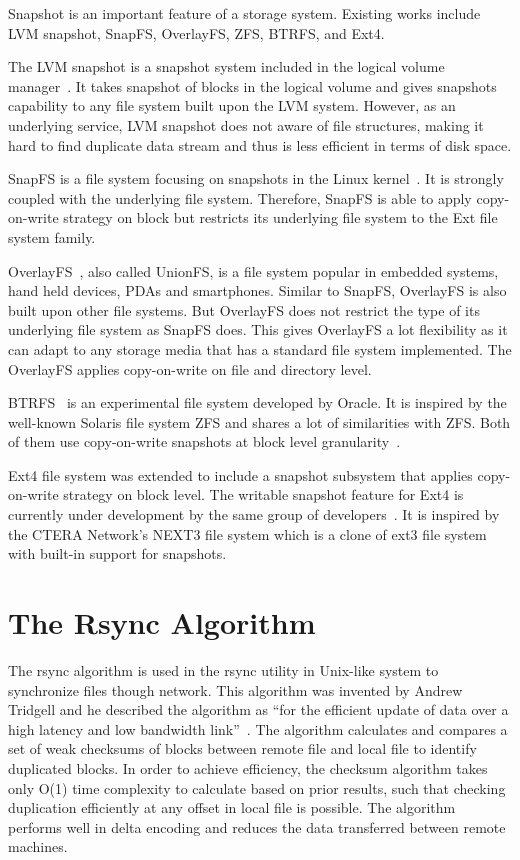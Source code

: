    Snapshot is an important feature of a storage system. Existing works include LVM snapshot, SnapFS, OverlayFS, ZFS, BTRFS, and Ext4.
    
    The LVM snapshot is a snapshot system included in the logical volume manager~\cite{lvm, disk_perform_lvm}. It takes snapshot of blocks in the logical volume and gives snapshots capability to any file system built upon the LVM system. However, as an underlying service, LVM snapshot does not aware of file structures, making it hard to find duplicate data stream and thus is less efficient in terms of disk space.
    
    SnapFS is a file system focusing on snapshots in the Linux kernel~\cite{snapfs}. It is strongly coupled with the underlying file system. Therefore, SnapFS is able to apply copy-on-write strategy on block but restricts its underlying file system to the Ext file system family. 
    
    OverlayFS~\cite{overlayfs}, also called UnionFS, is a file system popular in embedded systems, hand held devices, PDAs and smartphones. Similar to SnapFS, OverlayFS is also built upon other file systems. But OverlayFS does not restrict the type of its underlying file system as SnapFS does. This gives OverlayFS a lot flexibility as it can adapt to any storage media that has a standard file system implemented. The OverlayFS applies copy-on-write on file and directory level.

    BTRFS~\cite{btrfs} is an experimental file system developed by Oracle. It is inspired by the well-known Solaris file system ZFS and shares a lot of similarities with ZFS. Both of them use copy-on-write snapshots at block level granularity~\cite{btrfscow}.
    
    Ext4 file system was extended to include a snapshot subsystem that applies copy-on-write strategy on block level. The writable snapshot feature for Ext4 is currently under development by the same group of developers~\cite{ext4snap}. It is inspired by the CTERA Network's NEXT3 file system which is a clone of ext3 file system with built-in support for snapshots.

\section{The Rsync Algorithm}
    
    The rsync algorithm is used in the rsync utility in Unix-like system to synchronize files though network. This algorithm was invented by Andrew Tridgell and he described the algorithm as ``for the efficient update of data over a high latency and low bandwidth link''~\cite{rsync_alg}. The algorithm calculates and compares a set of weak checksums of blocks between remote file and local file to identify duplicated blocks. In order to achieve efficiency, the checksum algorithm takes only O(1) time complexity to calculate based on prior results, such that checking duplication efficiently at any offset in local file is possible. The algorithm performs well in delta encoding and reduces the data transferred between remote machines.

